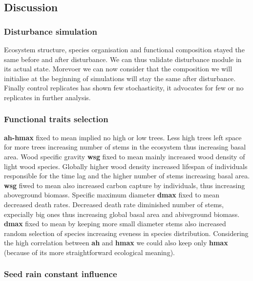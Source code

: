 \documentclass[12pt,]{article}
\theoremstyle{definition}
\theoremstyle{definition}
\theoremstyle{remark}
\begin{document}
\subsection{Discussion}\label{discussion-1}

\subsubsection{Disturbance simulation}\label{disturbance-simulation}

Ecosystem structure, species organisation and functional composition
stayed the same before and after disturbance. We can thus validate
disturbance module in its actual state. Morevoer we can now consider
that the composition we will initialise at the beginning of simulations
will stay the same after disturbance. Finally control replicates has
shown few stochasticity, it advocates for few or no replicates in
further analysis.

\subsubsection{Functional traits
selection}\label{functional-traits-selection}

\textbf{ah-hmax} fixed to mean implied no high or low trees. Less high
trees left space for more trees increasing number of stems in the
ecosystem thus increasing basal area. Wood specific gravity \textbf{wsg}
fixed to mean mainly increased wood density of light wood species.
Globally higher wood density increased lifespan of individuals
responsible for the time lag and the higher number of stems increasing
basal area. \textbf{wsg} fiwed to mean also increased carbon capture by
individuals, thus increasing aboveground biomass. Specific maximum
diameter \textbf{dmax} fixed to mean decreased death rates. Decreased
death rate diminished number of stems, expecially big ones thus
increasing global basal area and abiveground biomass. \textbf{dmax}
fixed to mean by keeping more small diameter stems also increased random
selection of species increasing eveness in species distribution.
Considering the high correlation between \textbf{ah} and \textbf{hmax}
we could also keep only \textbf{hmax} (because of its more
straightforward ecological meaning).

\subsubsection{Seed rain constant
influence}\label{seed-rain-constant-influence}
\end{document}
